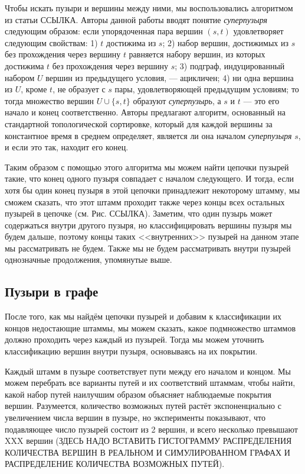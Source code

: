 \documentclass{spbau-diploma}
\begin{document}
Чтобы искать пузыри и вершины между ними, мы воспользовались алгоритмом из статьи ССЫЛКА. Авторы данной работы вводят понятие \textit{суперпузыря} следующим образом: если упорядоченная пара вершин $(s,t)$ удовлетворяет следующим свойствам:
1) $t$ достижима из $s$;
2) набор вершин, достижимых из $s$ без прохождения через вершину $t$ равняется набору вершин, из которых достижима $t$ без прохождения через вершину $s$;
3) подграф, индуцированный набором $U$ вершин из предыдущего условия, --- ацикличен;
4) ни одна вершина из $U$, кроме $t$, не образует с $s$ пары, удовлетворяющей предыдущим условиям; то тогда множество вершин $U \cup \{s,t\}$ образуют \textit{суперпузырь}, а $s$ и $t$ --- это его начало и конец соответственно. Авторы предлагают алгоритм, основанный на стандартной топологической сортировке, который для каждой вершины за константное время в среднем определяет, является ли она началом \textit{суперпузыря} $s$, и если это так, находит его конец. 

Таким образом с помощью этого алгоритма мы можем найти цепочки пузырей такие, что конец одного пузыря совпадает с началом следующего. И тогда, если хотя бы один конец пузыря в этой цепочки принадлежит некоторому штамму, мы сможем сказать, что этот штамм проходит также через концы всех остальных пузырей в цепочке (см. Рис. ССЫЛКА). Заметим, что один пузырь может содержаться внутри другого пузыря, но классифицировать вершины пузыря мы будем дальше, поэтому концы таких <<внутренних>> пузырей на данном этапе мы рассматривать не будем. Также мы не будем рассматривать внутри пузырей однозначные продолжения, упомянутые выше.

\subsection{Пузыри в графе}

После того, как мы найдём цепочки пузырей и добавим к классификации их концов недостающие штаммы, мы можем сказать, какое подмножество штаммов должно проходить через каждый из пузырей. Тогда мы можем уточнить классификацию вершин внутри пузыря, основываясь на их покрытии. 

Каждый штамм в пузыре соответствует пути между его началом и концом. Мы можем перебрать все варианты путей и их соответствий штаммам, чтобы найти, какой набор путей наилучшим образом объясняет наблюдаемые покрытия вершин. Разумеется, количество возможных путей растёт экспоненциально с увеличением числа вершин в пузыре, но эксперименты показывают, что подавляющее число пузырей состоит из 2 вершин, и всего несколько превышают XXX вершин (ЗДЕСЬ НАДО ВСТАВИТЬ ГИСТОГРАММУ РАСПРЕДЕЛЕНИЯ КОЛИЧЕСТВА ВЕРШИН В РЕАЛЬНОМ И СИМУЛИРОВАННОМ ГРАФАХ И РАСПРЕДЕЛЕНИЕ КОЛИЧЕСТВА ВОЗМОЖНЫХ ПУТЕЙ).
\end{document}

